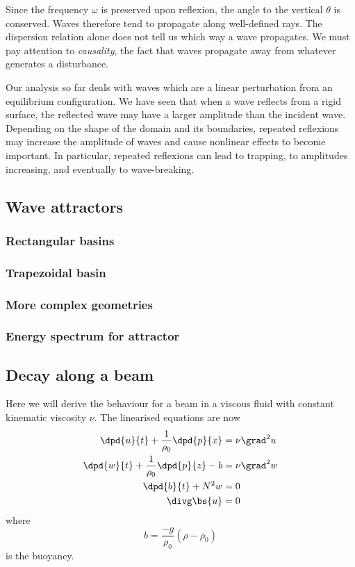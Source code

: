 Since the frequency $\omega$ is preserved upon reflexion, the angle to the vertical $\theta$ is conserved. Waves therefore tend to propagate along well-defined rays. The dispersion relation alone does not tell us which way a wave propagates. We must pay attention to \textit{causality}, the fact that waves propagate away from whatever generates a disturbance. 

Our analysis so far deals with waves which are a linear perturbation from an equilibrium configuration. We have seen that when a wave reflects from a rigid surface, the reflected wave may have a larger amplitude than the incident wave. Depending on the shape of the domain and its boundaries, repeated reflexions may increase the amplitude of waves and cause nonlinear effects to become important. In particular, repeated reflexions can lead to trapping, to amplitudes increasing, and eventually to wave-breaking. 

\subsection{Wave attractors}
\subsubsection{Rectangular basins}
\subsubsection{Trapezoidal basin}
\subsubsection{More complex geometries}
\subsubsection{Energy spectrum for attractor}

\subsection{Decay along a beam}

Here we will derive the behaviour for a beam in a viscous fluid with constant kinematic viscosity $\nu$. The linearised equations are now
\begin{align}
	\dpd{u}{t} + \frac{1}{\rho_0}\dpd{p}{x} &= \nu\grad^2 u \\
	\dpd{w}{t} + \frac{1}{\rho_0}\dpd{p}{z} - b &= \nu\grad^2 w \\
	\dpd{b}{t} + N^2w &= 0 \\
	\divg\bs{u} &= 0
\end{align}
where 
\begin{equation}
	b = \displaystyle\frac{-g}{\rho_0} (\rho-\rho_0)
\end{equation}
is the buoyancy. 


